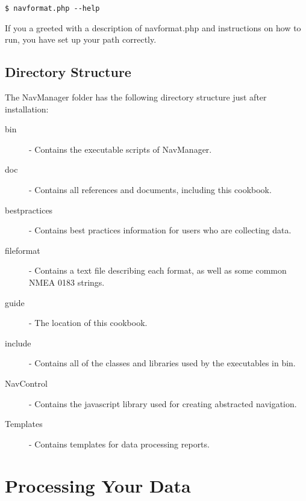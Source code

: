 \documentclass{article}
\begin{document}
		\begin{lstlisting}
$ navformat.php --help
		\end{lstlisting}
		
If you a greeted with a description of navformat.php and instructions on how to run, you have set up your path correctly.

		\break
		\subsection{Directory Structure}
		
The NavManager folder has the following directory structure just after installation:

\vspace{7mm}

		
\vspace{7mm}

\begin{description}		
\item[bin] - Contains the executable scripts of NavManager.
\item[doc] - Contains all references and documents, including this cookbook.
\item[bestpractices] - Contains best practices information for users who are collecting data.
\item[fileformat] - Contains a text file describing each format, as well as some common NMEA 0183 strings.
\item[guide] - The location of this cookbook.
\item[include] - Contains all of the classes and libraries used by the executables in bin.
\item[NavControl] - Contains the javascript library used for creating abstracted navigation.
\item[Templates] - Contains templates for data processing reports.
\end{description}
		
	\newpage
	\section{Processing Your Data}
\end{document}
